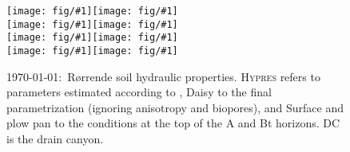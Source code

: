 \documentclass[a4paper]{article}
\newcommand{\figl}{\hspace*{-2cm}}
\newcommand{\figright}[1]{\texttt{[image: fig/\#1]}}
\newcommand{\fig}[1]{\figl\figright{#1}}
\newcommand{\Hypres}{\textsc{Hypres}}
\newcommand{\MyID}{\today:~}
\begin{document}
\begin{figure}[htbp] 
  \fig{Rorrende-Ap-Theta}\figright{Rorrende-Ap-K}\\
  \fig{Rorrende-Bt-Theta}\figright{Rorrende-Bt-K}\\
  \fig{Rorrende-C-Theta}\figright{Rorrende-C-K}\\
  \fig{Rorrende-DC-Theta}\figright{Rorrende-DC-K}
  \caption{\MyID{}R{\o}rrende soil hydraulic properties.  \Hypres{} refers to
    parameters estimated according to \citet{hypres}, Daisy to the
    final parametrization (ignoring anisotropy and biopores), and
    Surface and plow pan to the conditions at the top of the A and Bt
    horizons.  DC is the drain canyon.}
  \label{fig:Rorrende-hor}
\end{figure}

\pagestyle{empty}

\end{document}
